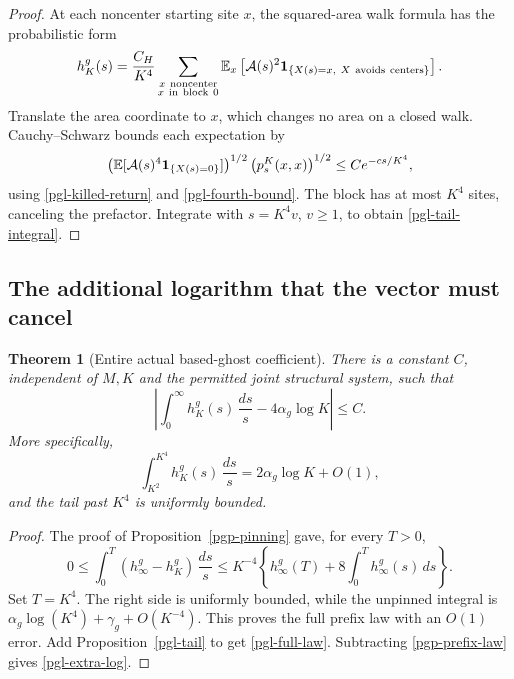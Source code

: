 \documentclass[11pt]{article}
\newtheorem{theorem}{Theorem}[section]
\theoremstyle{remark}
\begin{document}
\begin{proof}
At each noncenter starting site \(x\), the squared-area
walk formula has the probabilistic form
\[
 h_K^g(s)=\frac{C_H}{K^4}
 \sum_{\substack{x\ {\rm noncenter}\\x\ {\rm in\ block}\ 0}}
 \mathbb E_x\left[{\cal A}(s)^2
    {\bf1}_{\{X(s)=x,\ X\ {\rm avoids\ centers}\}}\right].
\]
Translate the area coordinate to \(x\), which changes
no area on a closed walk. Cauchy--Schwarz bounds each
expectation by
\[
 \left(\mathbb E[{\cal A}(s)^4
                       {\bf1}_{\{X(s)=0\}}]\right)^{1/2}
                  \left(p_s^K(x,x)\right)^{1/2}
 \le C e^{-c s/K^4},
\]
using \eqref{pgl-killed-return} and
\eqref{pgl-fourth-bound}. The block has at most \(K^4\)
sites, canceling the prefactor. Integrate with
\(s=K^4v\), \(v\ge1\), to obtain
\eqref{pgl-tail-integral}.
\end{proof}

\subsection{The additional logarithm that the vector must cancel}
\label{pgl-full-section}

\begin{theorem}[Entire actual based-ghost coefficient]
\label{pgl-full}
There is a constant \(C\), independent of \(M,K\) and
the permitted joint structural system, such that
\begin{equation}
 \left|\int_0^\infty h_K^g(s)\,\frac{ds}{s}
                      -4\alpha_g\log K\right|\le C.
 \label{pgl-full-law}
\end{equation}
More specifically,
\begin{equation}
 \int_{K^2}^{K^4} h_K^g(s)\,\frac{ds}{s}
                         =2\alpha_g\log K+O(1),
 \label{pgl-extra-log}
\end{equation}
and the tail past \(K^4\) is uniformly bounded.
\end{theorem}

\begin{proof}
The proof of Proposition~\ref{pgp-pinning} gave, for
every \(T>0\),
\[
 0\le\int_0^T(h_\infty^g-h_K^g)\,\frac{ds}{s}
 \le K^{-4}\left\{h_\infty^g(T)
                    +8\int_0^T h_\infty^g(s)\,ds\right\}.
\]
Set \(T=K^4\). The right side is uniformly bounded,
while the unpinned integral is
\(\alpha_g\log(K^4)+\gamma_g+O(K^{-4})\).
This proves the full prefix law with an \(O(1)\)
error. Add Proposition~\ref{pgl-tail} to get
\eqref{pgl-full-law}. Subtracting
\eqref{pgp-prefix-law} gives \eqref{pgl-extra-log}.
\end{proof}
\end{document}
